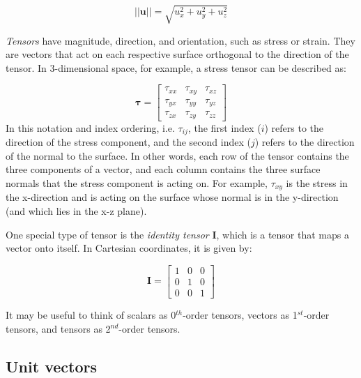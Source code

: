 \documentclass[12pt]{article}
\numberwithin{equation}{section}
\numberwithin{figure}{section}
\numberwithin{table}{section}
\begin{document}
\begin{equation}
  ||\mathbf{u}|| = \sqrt{u_x^2 + u_y^2 + u_z^2}
\end{equation}

\textit{Tensors} have magnitude, direction, and orientation, such as stress or
strain.
They are vectors that act on each respective surface orthogonal to the direction
of the tensor.
In 3-dimensional space, for example, a stress tensor can be described as:

\begin{equation}
  \boldsymbol{\tau} =
  \begin{bmatrix}
    \tau_{xx} & \tau_{xy} & \tau_{xz} \\
    \tau_{yx} & \tau_{yy} & \tau_{yz} \\
    \tau_{zx} & \tau_{zy} & \tau_{zz}
  \end{bmatrix}
\end{equation}
In this notation and index ordering, i.e. $\tau_{ij}$, the first index ($i$)
refers to the direction of the stress component, and the second index ($j$)
refers to the direction of the normal to the surface.
In other words, each row of the tensor contains the three components of a
vector, and each column contains the three surface normals that the stress
component is acting on.
For example, $\tau_{xy}$ is the stress in the x-direction and is acting on the
surface whose normal is in the y-direction (and which lies in the x-z plane).

One special type of tensor is the \textit{identity tensor}
$\mathbf{I}$, which is a tensor that maps a vector onto itself.
In Cartesian coordinates, it is given by:

\begin{equation}
  \mathbf{I} =
  \begin{bmatrix}
    1 & 0 & 0 \\
    0 & 1 & 0 \\
    0 & 0 & 1
  \end{bmatrix}
\end{equation}

It may be useful to think of scalars as 0$^{th}$-order tensors, vectors as
1$^{st}$-order tensors, and tensors as 2$^{nd}$-order tensors.\\

\subsection{Unit vectors}
\end{document}
